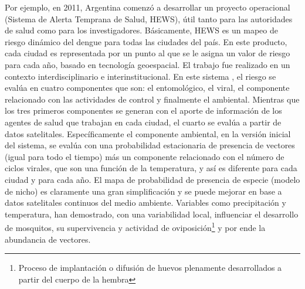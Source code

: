 \par Por ejemplo, en 2011, Argentina comenzó a desarrollar un proyecto operacional
  (Sistema de Alerta Temprana de Salud, HEWS), útil tanto para las autoridades de
  salud como para los investigadores.
  Básicamente, HEWS es un mapeo de riesgo dinámico del dengue para todas las
  ciudades del país. En este producto, cada ciudad es representada por un punto
  al que se le asigna un valor de riesgo para cada año, basado en tecnología
  geoespacial. El trabajo fue realizado en un contexto interdisciplinario e
  interinstitucional. En este sistema \cite{porcasi_operative}, el riesgo se evalúa en cuatro componentes que son: el
  entomológico, el viral, el componente relacionado con las actividades de
  control y finalmente el ambiental. Mientras que los tres primeros componentes
  se generan con el aporte de información de los agentes de salud que trabajan en cada
  ciudad, el cuarto se evalúa a partir de datos satelitales.
  Específicamente el componente ambiental, en la versión inicial del sistema, se
  evalúa con una probabilidad estacionaria de presencia de vectores (igual para
  todo el tiempo) más un componente relacionado con el número de ciclos virales,
  que son una función de la temperatura, y así es diferente para cada ciudad y
  para cada año. El mapa de probabilidad de presencia de especie (modelo de nicho)
  es claramente una gran simplificación y se puede mejorar en base a datos
  satelitales continuos del medio ambiente. Variables como precipitación y
  temperatura, han demostrado, con una variabilidad local, influenciar el
  desarrollo de mosquitos, su supervivencia y actividad de
  oviposición\footnote{Proceso de implantación o difusión de huevos plenamente
  desarrollados a partir del cuerpo de la hembra} y por ende la abundancia de vectores.

